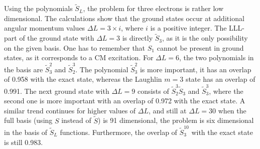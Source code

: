 \documentclass{article}
\begin{document}
Using the polynomials $\tilde S_L$, the problem for three electrons is
rather low dimensional. The calculations show that the ground states
occur at additional angular momentum values $\Delta L = 3 \times i$, where
$i$ is a positive integer\cite{epl}. The LLL-part of the ground state
with $\Delta L=3$ is directly $\tilde S_3$, as it is the only
possibility on the given basis. One has to remember that $S_1$ cannot
be present in ground states, as it corresponds to a CM excitation. For
$\Delta L = 6$, the two polynomials in the basis are $\tilde S_3^2$
and $\tilde S_2^3$.  The polynomial $\tilde S_3^2$ is more important,
it has an overlap of 0.958 with the exact state, whereas the Laughlin
$m=3$ state has an overlap of 0.991. The next ground state with
$\Delta L = 9$ consists of $\tilde S_2^3 \tilde S_3$ and $\tilde S_3^3
$, where the second one is more important with an overlap of 0.972
with the exact state. A similar trend continues for higher values of
$\Delta L$, and still at $\Delta L =30$ when the full basis (using $S$
instead of $\tilde S$) is 91 dimensional, the problem is six
dimensional in the basis of $\tilde S_L$ functions. Furthermore, the
overlap of $\tilde S_3^{10}$ with the exact state is still 0.983.
\end{document}
